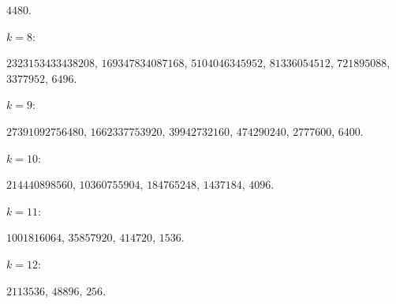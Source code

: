 $4480$.\par\endgroup
\par\smallskip\noindent$k=8$: \begingroup\small\raggedright
$2323153433438208$,\allowbreak{} 
$169347834087168$,\allowbreak{} 
$5104046345952$,\allowbreak{} 
$81336054512$,\allowbreak{} 
$721895088$,\allowbreak{} 
$3377952$,\allowbreak{} 
$6496$.\par\endgroup
\par\smallskip\noindent$k=9$: \begingroup\small\raggedright
$27391092756480$,\allowbreak{} 
$1662337753920$,\allowbreak{} 
$39942732160$,\allowbreak{} 
$474290240$,\allowbreak{} 
$2777600$,\allowbreak{} 
$6400$.\par\endgroup
\par\smallskip\noindent$k=10$: \begingroup\small\raggedright
$214440898560$,\allowbreak{} 
$10360755904$,\allowbreak{} 
$184765248$,\allowbreak{} 
$1437184$,\allowbreak{} 
$4096$.\par\endgroup
\par\smallskip\noindent$k=11$: \begingroup\small\raggedright
$1001816064$,\allowbreak{} 
$35857920$,\allowbreak{} 
$414720$,\allowbreak{} 
$1536$.\par\endgroup
\par\smallskip\noindent$k=12$: \begingroup\small\raggedright
$2113536$,\allowbreak{} 
$48896$,\allowbreak{} 
$256$.\par\endgroup
